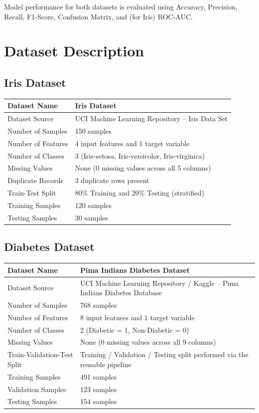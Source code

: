 \documentclass[12pt,a4paper]{article}
\begin{document}
Model performance for both datasets is evaluated using Accuracy, Precision, Recall, F1-Score, Confusion Matrix, and (for Iris) ROC-AUC.

\section{Dataset Description}

\subsection*{Iris Dataset}

\begin{longtable}{|p{6cm}|p{8cm}|}
\hline
Dataset Name & Iris Dataset \\ \hline
Dataset Source & UCI Machine Learning Repository -- Iris Data Set \\ \hline
Number of Samples & 150 samples \\ \hline
Number of Features & 4 input features and 1 target variable \\ \hline
Number of Classes & 3 (Iris-setosa, Iris-versicolor, Iris-virginica) \\ \hline
Missing Values & None (0 missing values across all 5 columns) \\ \hline
Duplicate Records & 3 duplicate rows present \\ \hline
Train-Test Split & 80\% Training and 20\% Testing (stratified) \\ \hline
Training Samples & 120 samples \\ \hline
Testing Samples & 30 samples \\ \hline
\end{longtable}

\subsection*{Diabetes Dataset}

\begin{longtable}{|p{6cm}|p{8cm}|}
\hline
Dataset Name & Pima Indians Diabetes Dataset \\ \hline
Dataset Source & UCI Machine Learning Repository / Kaggle -- Pima Indians Diabetes Database \\ \hline
Number of Samples & 768 samples \\ \hline
Number of Features & 8 input features and 1 target variable \\ \hline
Number of Classes & 2 (Diabetic = 1, Non-Diabetic = 0) \\ \hline
Missing Values & None (0 missing values across all 9 columns) \\ \hline
Train-Validation-Test Split & Training / Validation / Testing split performed via the reusable pipeline \\ \hline
Training Samples & 491 samples \\ \hline
Validation Samples & 123 samples \\ \hline
Testing Samples & 154 samples \\ \hline
\end{longtable}
\end{document}
